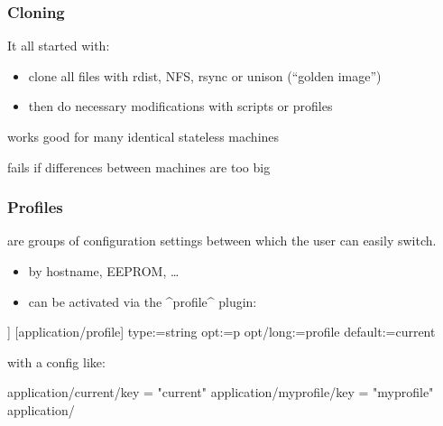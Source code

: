 \begin{frame}
	\frametitle{Cloning}

	It all started with:

	\begin{itemize}[<+-| alert@+>]
	\item clone all files with rdist, NFS, rsync or unison (``golden image'')
	\item then do necessary modifications with scripts or profiles
	\end{itemize}

	\vspace{1cm}
	\pause[\thebeamerpauses]

	\begin{description}[<+-| alert@+>]
	\item[$+$] works good for many identical stateless machines
	\item[$-$] fails if differences between machines are too big
	\end{description}
\end{frame}

\begin{frame}[fragile]
	\frametitle{Profiles}

	 are groups of configuration settings between which the user can easily switch.
	\begin{itemize}
	\item by hostname, EEPROM, \dots
	\item can be activated via the ^profile^ plugin:
	\end{itemize}

	\begin{code}[morekeywords={long},gobble=4]]
	[application/profile]
	type:=string
	opt:=p
	opt/long:=profile
	default:=current
	\end{code}

	\pause
	with a config like:
	\begin{code}[gobble=4,language=CfgElektra]
	application/current/key = "current"
	application/myprofile/key = "myprofile"
	application/%
	\end{code}
\end{frame}

